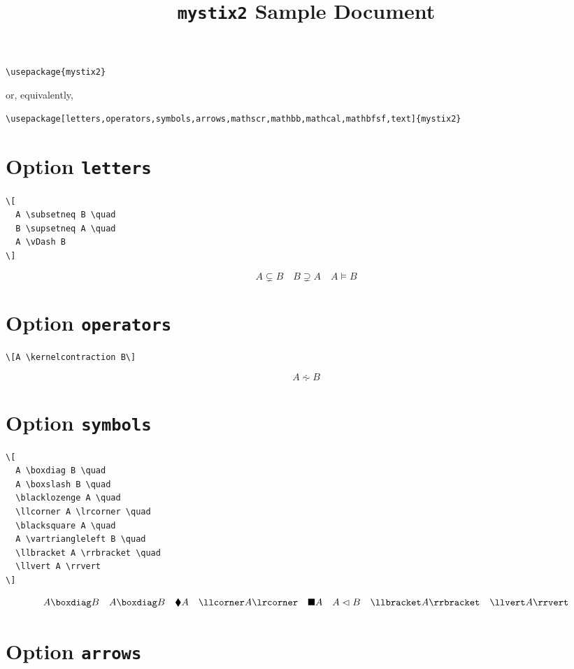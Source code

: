 \documentclass{article}
\begin{document}
\title{\texttt{mystix2} Sample Document}
\author{}
\date{}

\maketitle

\begin{verbatim}
\usepackage{mystix2}
\end{verbatim}
%
or, equivalently,
%
\begin{verbatim}
\usepackage[letters,operators,symbols,arrows,mathscr,mathbb,mathcal,mathbfsf,text]{mystix2}
\end{verbatim}

\section{Option \texttt{letters}}

\begin{verbatim}
\[
  A \subsetneq B \quad
  B \supsetneq A \quad
  A \vDash B
\]
\end{verbatim}
%
\[
  A \subsetneq B \quad
  B \supsetneq A \quad
  A \vDash B
\]

\section{Option \texttt{operators}}

\begin{verbatim}
\[A \kernelcontraction B\]
\end{verbatim}
%
\[A \kernelcontraction B\]

\section{Option \texttt{symbols}}

\begin{verbatim}
\[
  A \boxdiag B \quad
  A \boxslash B \quad
  \blacklozenge A \quad
  \llcorner A \lrcorner \quad
  \blacksquare A \quad
  A \vartriangleleft B \quad
  \llbracket A \rrbracket \quad
  \llvert A \rrvert
\]
\end{verbatim}
%
\[
  A \boxdiag B \quad
  A \boxslash B \quad
  \blacklozenge A \quad
  \llcorner A \lrcorner \quad
  \blacksquare A \quad
  A \vartriangleleft B \quad
  \llbracket A \rrbracket \quad
  \llvert A \rrvert
\]

\section{Option \texttt{arrows}}
\end{document}
